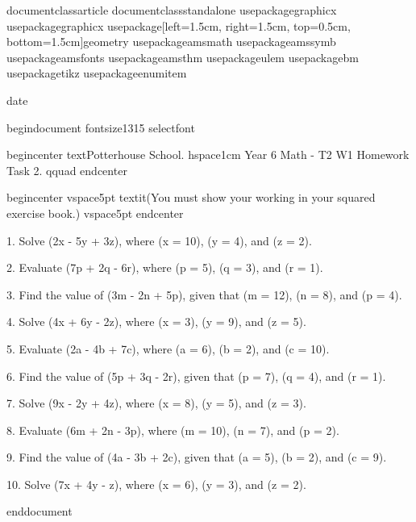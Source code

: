 documentclass{article}
documentclass{standalone}
usepackage{graphicx} %
usepackage{graphicx} %
usepackage[left=1.5cm, right=1.5cm, top=0.5cm, bottom=1.5cm]{geometry}
usepackage{amsmath}
usepackage{amssymb}
usepackage{amsfonts}
usepackage{amsthm}
usepackage{ulem}
usepackage{bm}
usepackage{tikz}
usepackage{enumitem}

date{}

begin{document}
fontsize{13}{15} selectfont %

begin{center}
 text{Potterhouse School. hspace{1cm} Year 6 Math - T2 W1 Homework Task 2.} qquad  
end{center}  

begin{center}
vspace{5pt} 
textit{(You must show your working in your squared exercise book.)  }
vspace{5pt}
end{center}

1. Solve (2x - 5y + 3z), where (x = 10), (y = 4), and (z = 2). 

2. Evaluate (7p + 2q - 6r), where (p = 5), (q = 3), and (r = 1). 

3. Find the value of (3m - 2n + 5p), given that (m = 12), (n = 8), and (p = 4). 

4. Solve (4x + 6y - 2z), where (x = 3), (y = 9), and (z = 5). 

5. Evaluate (2a - 4b + 7c), where (a = 6), (b = 2), and (c = 10). 

6. Find the value of (5p + 3q - 2r), given that (p = 7), (q = 4), and (r = 1). 

7. Solve (9x - 2y + 4z), where (x = 8), (y = 5), and (z = 3). 

8. Evaluate (6m + 2n - 3p), where (m = 10), (n = 7), and (p = 2). 

9. Find the value of (4a - 3b + 2c), given that (a = 5), (b = 2), and (c = 9). 

10. Solve (7x + 4y - z), where (x = 6), (y = 3), and (z = 2). 



end{document}